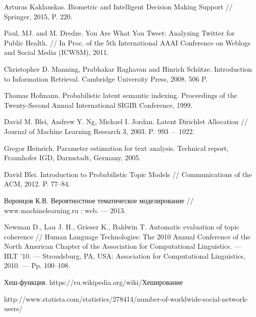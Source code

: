 \documentclass[a4paper]{report}
\begin{document}
    \begingroup
    \let\clearpage\relax
    \vskip-3cm
	\begin{thebibliography}{9}
	
		Arturas Kaklauskas. Biometric and Intelligent Decision Making Support // Springer, 2015, P. 220.
		
		Paul, MJ. and M. Dredze. You Are What You Tweet: Analyzing Twitter for Public Health. // In Proc. of the 5th International AAAI Conference on Weblogs and Social Media (ICWSM),  2011. 
		
		Christopher D. Manning, Prabhakar Raghavan and Hinrich Schütze. Introduction to Information Retrieval. Cambridge University Press, 2008. 506 P.
		
		Thomas Hofmann. Probabilistic latent semantic indexing. Proceedings of the Twenty-Second Annual International SIGIR Conference, 1999.
		
		David M. Blei, Andrew Y. Ng, Michael I. Jordan. Latent Dirichlet Allocation // Journal of Machine Learning Research 3, 2003. P.~993~--~1022.
		
		Gregor Heinrich. Parameter estimation for text analysis. Technical
report, Fraunhofer IGD, Darmstadt, Germany, 2005.

		David Blei. Introduction to Probabilistic Topic Models // Communications of the ACM, 2012. P. 77–84.

		Воронцов К.В. Вероятностное тематическое моделирование // www.machinelearning.ru : web. — 2013.

		Newman D., Lau J. H., Grieser K., Baldwin T. Automatic evaluation of topic
coherence // Human Language Technologies: The 2010 Annual Conference of the
North American Chapter of the Association for Computational Linguistics. — HLT
’10. — Stroudsburg, PA, USA: Association for Computational Linguistics, 2010. —
Pp. 100–108.

		Хеш-функция. https://ru.wikipedia.org/wiki/Хеширование

		http://www.statista.com/statistics/278414/number-of-worldwide-social-network-users/


\end{thebibliography}
\end{document}
